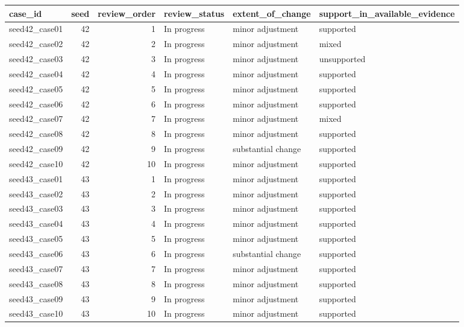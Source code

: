 \begin{table}[htbp!]
\centering
\small
\setlength{\tabcolsep}{3pt}
\renewcommand{\arraystretch}{1.1}
\begin{tabular}{lrrlll}
\hline
case\_id & seed & review\_order & review\_status & extent\_of\_change & support\_in\_available\_evidence \\
\hline
seed42\_case01 & 42 & 1 & In progress & minor adjustment & supported \\
seed42\_case02 & 42 & 2 & In progress & minor adjustment & mixed \\
seed42\_case03 & 42 & 3 & In progress & minor adjustment & unsupported \\
seed42\_case04 & 42 & 4 & In progress & minor adjustment & supported \\
seed42\_case05 & 42 & 5 & In progress & minor adjustment & supported \\
seed42\_case06 & 42 & 6 & In progress & minor adjustment & supported \\
seed42\_case07 & 42 & 7 & In progress & minor adjustment & mixed \\
seed42\_case08 & 42 & 8 & In progress & minor adjustment & supported \\
seed42\_case09 & 42 & 9 & In progress & substantial change & supported \\
seed42\_case10 & 42 & 10 & In progress & minor adjustment & supported \\
seed43\_case01 & 43 & 1 & In progress & minor adjustment & supported \\
seed43\_case02 & 43 & 2 & In progress & minor adjustment & supported \\
seed43\_case03 & 43 & 3 & In progress & minor adjustment & supported \\
seed43\_case04 & 43 & 4 & In progress & minor adjustment & supported \\
seed43\_case05 & 43 & 5 & In progress & minor adjustment & supported \\
seed43\_case06 & 43 & 6 & In progress & substantial change & supported \\
seed43\_case07 & 43 & 7 & In progress & minor adjustment & supported \\
seed43\_case08 & 43 & 8 & In progress & minor adjustment & supported \\
seed43\_case09 & 43 & 9 & In progress & minor adjustment & supported \\
seed43\_case10 & 43 & 10 & In progress & minor adjustment & supported \\

\end{tabular}
\end{table}

